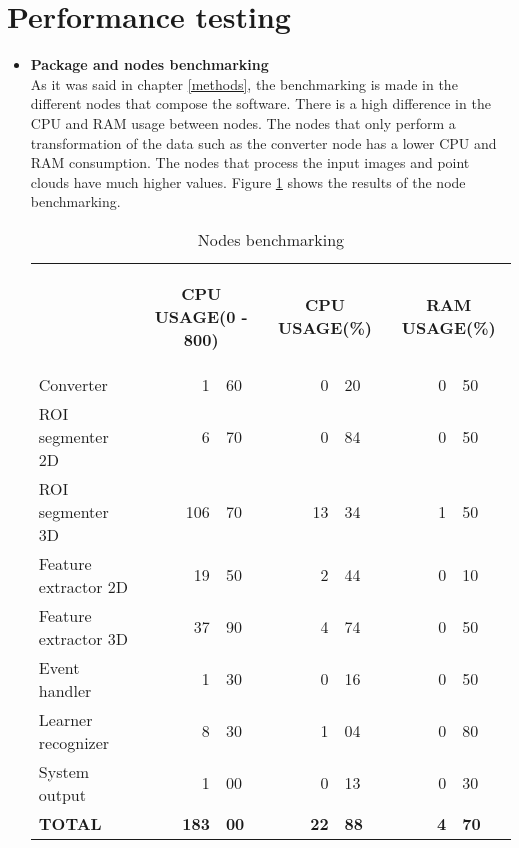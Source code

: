 \section{Performance testing}

	\begin{itemize}
		\item{\textbf{Package and nodes benchmarking}}
		\\

			As it was said in chapter \ref{methods}, the benchmarking is made in the different nodes that compose the software. 
			There is a high difference in the CPU and RAM usage between nodes.
			The nodes that only perform a transformation of the data such as the converter node has a lower CPU and RAM consumption.
			The nodes that process the input images and point clouds have much higher values. 
			Figure \ref{node_bench} shows the results of the node benchmarking. 


\begin{table}[H]
\centering
\caption{Nodes benchmarking}
\begin{tabular} {l c r@{.}l c r@{.}l c r@{.}l }
\toprule
\addlinespace[3mm]
   \multicolumn{1}{c}{\begin{center}\textbf{NODES}\end{center}} &
   \multicolumn{3}{c}{\begin{center}\textbf{CPU USAGE(0 - 800)}\end{center}} &
   \multicolumn{3}{c}{\begin{center}\textbf{CPU USAGE(\%)}\end{center}} &
   \multicolumn{3}{c}{\begin{center}\textbf{RAM USAGE(\%)}\end{center}} &\\
\addlinespace[-3mm]
\midrule
Converter && 1&60 && 0&20 && 0&50 \\
ROI segmenter 2D && 6&70 && 0&84 && 0&50\\
ROI segmenter 3D && 106&70 && 13&34 && 1&50\\
Feature extractor 2D && 19&50 && 2&44 && 0&10\\
Feature extractor 3D && 37&90 && 4&74 && 0&50\\
Event handler && 1&30 && 0&16 && 0&50 \\
Learner recognizer && 8&30 && 1&04 && 0&80 \\
System output && 1&00 && 0&13 && 0&30 \\
\textbf{TOTAL} && \textbf{183}&\textbf{00} &&\textbf{22}&\textbf{88} && \textbf{4}&\textbf{70} \\
\bottomrule
\end{tabular}
\label{node_bench}
\end{table}




\end{itemize}
